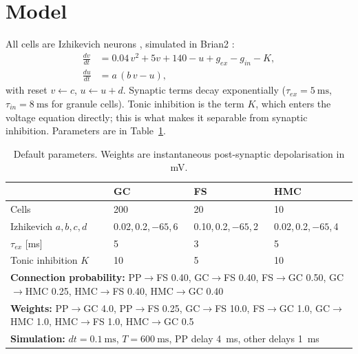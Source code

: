 \documentclass[11pt,a4paper]{article}
\begin{document}
\section{Model}
\label{sec:model}

All cells are Izhikevich neurons \cite{izhikevich2003}, simulated in Brian2
\cite{stimberg2019}:
\begin{align}
  \frac{dv}{dt} &= 0.04\,v^2 + 5v + 140 - u + g_{ex} - g_{in} - K,
  \label{eq:izh_v}\\
  \frac{du}{dt} &= a\,(b\,v - u),
\end{align}
with reset $v \leftarrow c$, $u \leftarrow u + d$. Synaptic terms decay
exponentially ($\tau_{ex}=\SI{5}{\milli\second}$, $\tau_{in}=\SI{8}{\milli\second}$
for granule cells). Tonic inhibition is the term $K$, which enters the voltage
equation directly; this is what makes it separable from synaptic inhibition.
Parameters are in Table~\ref{tab:params}.

\begin{table}[htbp]
  \centering
  \small
  \caption{Default parameters. Weights are instantaneous post-synaptic
  depolarisation in mV.}
  \label{tab:params}
  \begin{tabular}{llll}
    \toprule
    & \textbf{GC} & \textbf{FS} & \textbf{HMC}\\
    \midrule
    Cells                      & 200 & 20 & 10 \\
    Izhikevich $a,b,c,d$       & 0.02,\,0.2,\,$-65$,\,6
                               & 0.10,\,0.2,\,$-65$,\,2
                               & 0.02,\,0.2,\,$-65$,\,4 \\
    $\tau_{ex}$ [ms]           & 5 & 3 & 5 \\
    Tonic inhibition $K$       & 10 & 5 & 10 \\
    \midrule
    \multicolumn{4}{l}{\textbf{Connection probability:}
      PP$\to$FS 0.40, GC$\to$FS 0.40, FS$\to$GC 0.50,
      GC$\to$HMC 0.25, HMC$\to$FS 0.40, HMC$\to$GC 0.40}\\
    \multicolumn{4}{l}{\textbf{Weights:}
      PP$\to$GC 4.0, PP$\to$FS 0.25, GC$\to$FS 10.0, FS$\to$GC 1.0,
      GC$\to$HMC 1.0, HMC$\to$FS 1.0, HMC$\to$GC 0.5}\\
    \multicolumn{4}{l}{\textbf{Simulation:}
      $dt=\SI{0.1}{\milli\second}$, $T=\SI{600}{\milli\second}$,
      PP delay \SI{4}{\milli\second}, other delays \SI{1}{\milli\second}}\\
    \bottomrule
  \end{tabular}
\end{table}
\end{document}
